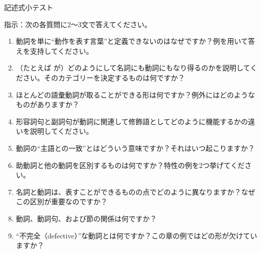 \begin{tblslineshorizontal}{記述式小テスト}

指示：次の各質問に2～3文で答えてください。

\begin{enumerate}[noitemsep]
    \item 動詞を単に\enquote{動作を表す言葉}と定義できないのはなぜですか？例を用いて答えを支持してください。
    \item （たとえば  が）どのようにして名詞にも動詞にもなり得るのかを説明してください。そのカテゴリーを決定するものは何ですか？
    \item ほとんどの語彙動詞が取ることができる形は何ですか？例外にはどのようなものがありますか？
    \item 形容詞句と副詞句が動詞に関連して修飾語としてどのように機能するかの違いを説明してください。
    \item 動詞の\enquote{主語との一致}とはどういう意味ですか？それはいつ起こりますか？
    \item 助動詞と他の動詞を区別するものは何ですか？特性の例を2つ挙げてください。
    \item 名詞と動詞は、表すことができるものの点でどのように異なりますか？なぜこの区別が重要なのですか？
    \item 動詞、動詞句、および節の関係は何ですか？
    \item \enquote{不完全（defective）}な動詞とは何ですか？この章の例ではどの形が欠けていますか？
\end{enumerate}

\end{tblslineshorizontal}

